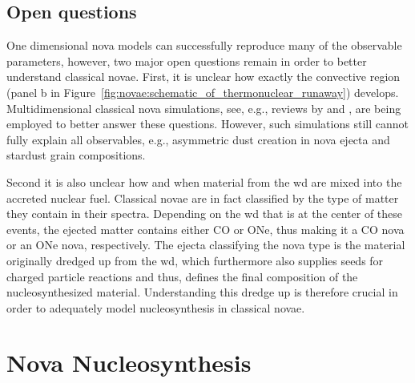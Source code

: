 \subsection{Open questions}\label{sec:novae:open_questions}

One dimensional nova models can successfully reproduce many of the observable parameters, however, two major open questions remain in order to better understand classical novae. First, it is unclear how exactly the convective region (panel b in Figure~\ref{fig:novae:schematic_of_thermonuclear_runaway}) develops. Multidimensional classical nova simulations, see, e.g., reviews by \citet{jose12} and \citet{starrfield16}, are being employed to better answer these questions. However, such simulations still cannot fully explain all observables, e.g., asymmetric dust creation in nova ejecta and stardust grain compositions.

Second it is also unclear how and when material from the \ac{wd} are mixed into the accreted nuclear fuel. Classical novae are in fact classified by the type of matter they contain in their spectra. Depending on the \ac{wd} that is at the center of these events, the ejected matter contains either CO or ONe, thus making it a CO nova or an ONe nova, respectively. The ejecta classifying the nova type is the material originally dredged up from the \ac{wd}, which furthermore also supplies seeds for charged particle reactions and thus, defines the final composition of the nucleosynthesized material. Understanding this dredge up is therefore crucial in order to adequately model nucleosynthesis in classical novae.



\section{Nova Nucleosynthesis}

